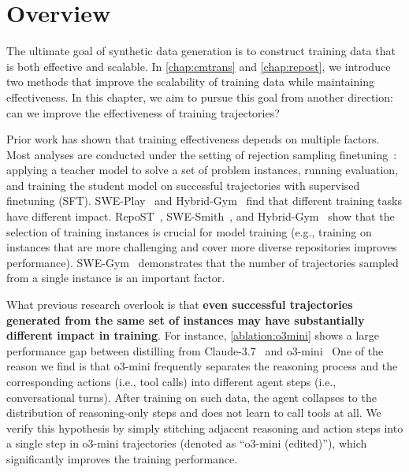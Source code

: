 \section{Overview}

The ultimate goal of synthetic data generation is to construct training data that is both effective and scalable.
In \autoref{chap:cmtrans} and \autoref{chap:repost}, we introduce two methods that improve the scalability of training data while maintaining effectiveness.
In this chapter, we aim to pursue this goal from another direction: can we improve the effectiveness of training trajectories?

Prior work has shown that training effectiveness depends on multiple factors.
Most analyses are conducted under the setting of rejection sampling finetuning~\cite{rejection-sampling}: applying a teacher model to solve a set of problem instances, running evaluation, and training the student model on successful trajectories with supervised finetuning (SFT).
SWE-Play~\cite{swe-play} and Hybrid-Gym~\cite{hybrid-gym} find that different training tasks have different impact.
RepoST~\cite{repost}, SWE-Smith~\cite{swe-smith}, and Hybrid-Gym~\cite{hybrid-gym} show that the selection of training instances is crucial for model training (e.g., training on instances that are more challenging and cover more diverse repositories improves performance).
SWE-Gym~\cite{swegym} demonstrates that the number of trajectories sampled from a single instance is an important factor.

What previous research overlook is that \textbf{even successful trajectories generated from the same set of instances may have substantially different impact in training}.
For instance, \autoref{ablation:o3mini} shows a large performance gap between distilling from Claude-3.7~\cite{claude37} and o3-mini~\cite{o3_mini}
One of the reason we find is that o3-mini frequently separates the reasoning process and the corresponding actions (i.e., tool calls) into different agent steps (i.e., conversational turns).
After training on such data, the agent collapses to the distribution of reasoning-only steps and does not learn to call tools at all.
We verify this hypothesis by simply stitching adjacent reasoning and action steps into a single step in o3-mini trajectories (denoted as ``o3-mini (edited)''), which significantly improves the training performance.


